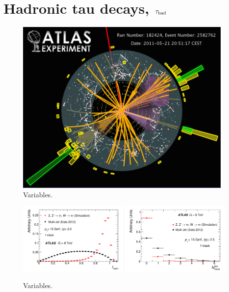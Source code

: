 \section{Hadronic tau decays, $\tau_\text{had}$}
\label{sec:taus-jetfakes}

\begin{figure}[tp]
  \centering
  \includegraphics[width=0.95\textwidth]{figures/tauperformance/vp1_3dcocktail_run182424_evt2582762_tttaumu}
  \caption{Variables.}
  \label{fig:taus-eventdisplay}
\end{figure}

\begin{figure}[tp]
  \centering
  \includegraphics[width=0.48\textwidth]{figures/PERF-2013-06/fig_02a}
  \includegraphics[width=0.48\textwidth]{figures/PERF-2013-06/fig_02b}
  \caption{Variables.}
  \label{fig:taus-id1p}
\end{figure}

